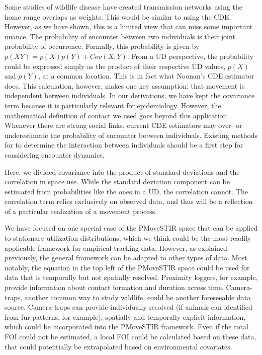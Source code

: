 \documentclass[letterpaper]{article}
\begin{document}
Some studies of wildlife disease have created transmission networks using the home range overlaps as weights. This would be similar to using the CDE.
However, as we have shown, this is a limited view that can miss some important nuance.
The probability of encounter between two individuals is their joint probability of occurrence.  Formally, this probability is given by $p(XY)=p(X)p(Y)+Cov(X,Y)$. From a UD perspective, the probability could be expressed simply as the product of their respective UD values, $p(X)$ and $p(Y)$, at a common location. %
This is in fact what Noonan's CDE estimator does. This calculation, however, makes one key assumption: that movement is independent between individuals. 
In our derivations, we have kept the covariance term because it is particularly relevant for epidemiology. However, the mathematical definition of contact we used goes beyond this application.  Whenever there are strong social links, current CDE estimators may over- or underestimate the probability of encounter between individuals. 
Existing methods for to determine the interaction between individuals \citep{Scharf2018} should be a first step for considering encounter dynamics. 

Here, we divided covariance into the product of standard deviations and the correlation in space use. While the standard deviation component can be estimated from probabilities like the ones in a UD, the correlation cannot. The correlation term relies exclusively on observed data, and thus will be a reflection of a particular realization of a movement process. 


We have focused on one special case of the PMoveSTIR space that can be applied to stationary utilization distributions, which we think could be the most readily applicable framework for empirical tracking data. 
However, as explained previously, the general framework can be adapted to other types of data. Most notably, the equation in the top left of the PMoveSTIR space could be used for data that is temporally but not spatially resolved. Proximity loggers, for example, provide information about contact formation and duration across time. 
Camera-traps, another common way to study wildlife, could be another foreseeable data source. Camera-traps can provide individually resolved (if animals can identified from fur patterns, for example), spatially and temporally explicit information, which could be incorporated into the PMoveSTIR framework. Even if the total FOI could not be estimated, a local FOI could be calculated based on these data, that could potentially be extrapolated based on environmental covariates. 
\end{document}

